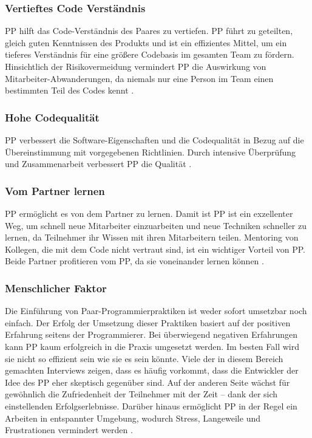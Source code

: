 \subsubsection {Vertieftes Code Verständnis} PP hilft das Code-Verständnis des Paares zu vertiefen. PP führt zu geteilten, gleich guten Kenntnissen des Produkts und ist ein effizientes Mittel, um ein tieferes Verständnis für eine größere Codebasis im gesamten Team zu fördern. Hinsichtlich der Risikovermeidung vermindert PP die Auswirkung von Mitarbeiter-Abwanderungen, da niemals nur eine Person im Team einen bestimmten Teil des Codes kennt \cite{Begel2008PairMe,Williams2010PairProgramming}.


\subsubsection{ Hohe Codequalität} PP verbessert die Software-Eigenschaften und die Codequalität in Bezug auf die Übereinstimmung mit vorgegebenen Richtlinien. Durch intensive Überprüfung und Zusammenarbeit verbessert PP die Qualität \cite{Begel2008PairMe,Williams2010PairProgramming}.

\subsubsection{Vom Partner lernen} PP ermöglicht es von dem Partner zu lernen. Damit ist PP ist ein exzellenter Weg, um schnell neue Mitarbeiter einzuarbeiten und neue Techniken schneller zu lernen, da Teilnehmer ihr Wissen mit ihren Mitarbeitern teilen. Mentoring von Kollegen, die mit dem Code nicht vertraut sind, ist ein wichtiger Vorteil von PP. Beide Partner profitieren vom PP, da sie voneinander lernen können \cite{Begel2008PairMe,Williams2010PairProgramming,Cockburn2001TheProgramming}.

\subsubsection{ Menschlicher Faktor} Die Einführung von Paar-Programmierpraktiken ist weder sofort umsetzbar noch einfach. Der Erfolg der Umsetzung dieser Praktiken basiert auf der positiven Erfahrung seitens der Programmierer. Bei überwiegend negativen Erfahrungen kann PP kaum erfolgreich in die Praxis umgesetzt werden. Im besten Fall wird sie nicht so effizient sein wie sie es sein könnte. Viele der in diesem Bereich gemachten Interviews zeigen, dass es häufig vorkommt, dass die Entwickler der Idee des PP eher skeptisch gegenüber sind. Auf der anderen Seite wächst für gewöhnlich die Zufriedenheit der Teilnehmer mit der Zeit – dank der sich einstellenden Erfolgserlebnisse. Darüber hinaus ermöglicht PP in der Regel ein Arbeiten in entspannter Umgebung, wodurch Stress, Langeweile und Frustrationen vermindert werden \cite{Cockburn2001TheProgramming}.



